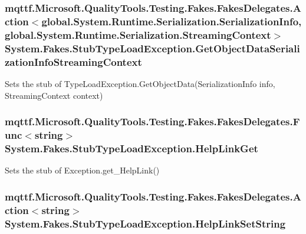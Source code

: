 \hypertarget{class_system_1_1_fakes_1_1_stub_type_load_exception_a363b0b3dd273ec0a5e730dfdde06ba42}{
\subsubsection[{Get\-Object\-Data\-Serialization\-Info\-Streaming\-Context}]{\setlength{\rightskip}{0pt plus 5cm}mqttf.\-Microsoft.\-Quality\-Tools.\-Testing.\-Fakes.\-Fakes\-Delegates.\-Action$<$global.\-System.\-Runtime.\-Serialization.\-Serialization\-Info, global.\-System.\-Runtime.\-Serialization.\-Streaming\-Context$>$ System.\-Fakes.\-Stub\-Type\-Load\-Exception.\-Get\-Object\-Data\-Serialization\-Info\-Streaming\-Context}}\label{class_system_1_1_fakes_1_1_stub_type_load_exception_a363b0b3dd273ec0a5e730dfdde06ba42}


Sets the stub of Type\-Load\-Exception.\-Get\-Object\-Data(\-Serialization\-Info info, Streaming\-Context context)

\hypertarget{class_system_1_1_fakes_1_1_stub_type_load_exception_a21f3635774c79577a9aa719483f0b860}{
\subsubsection[{Help\-Link\-Get}]{\setlength{\rightskip}{0pt plus 5cm}mqttf.\-Microsoft.\-Quality\-Tools.\-Testing.\-Fakes.\-Fakes\-Delegates.\-Func$<$string$>$ System.\-Fakes.\-Stub\-Type\-Load\-Exception.\-Help\-Link\-Get}}\label{class_system_1_1_fakes_1_1_stub_type_load_exception_a21f3635774c79577a9aa719483f0b860}


Sets the stub of Exception.\-get\-\_\-\-Help\-Link()

\hypertarget{class_system_1_1_fakes_1_1_stub_type_load_exception_af01ef9bb430bebf00d0f65a9dc94d281}{
\subsubsection[{Help\-Link\-Set\-String}]{\setlength{\rightskip}{0pt plus 5cm}mqttf.\-Microsoft.\-Quality\-Tools.\-Testing.\-Fakes.\-Fakes\-Delegates.\-Action$<$string$>$ System.\-Fakes.\-Stub\-Type\-Load\-Exception.\-Help\-Link\-Set\-String}}\label{class_system_1_1_fakes_1_1_stub_type_load_exception_af01ef9bb430bebf00d0f65a9dc94d281}



